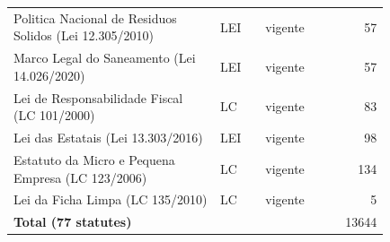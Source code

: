 \begin{longtable}{p{0.55\linewidth}p{0.12\linewidth}p{0.16\linewidth}r}
Politica Nacional de Residuos Solidos (Lei 12.305/2010) & LEI & vigente & 57\\
Marco Legal do Saneamento (Lei 14.026/2020) & LEI & vigente & 57\\
Lei de Responsabilidade Fiscal (LC 101/2000) & LC & vigente & 83\\
Lei das Estatais (Lei 13.303/2016) & LEI & vigente & 98\\
Estatuto da Micro e Pequena Empresa (LC 123/2006) & LC & vigente & 134\\
Lei da Ficha Limpa (LC 135/2010) & LC & vigente & 5\\
\hline\textbf{Total (77 statutes)} & & & 13644\\\hline
\end{longtable}
